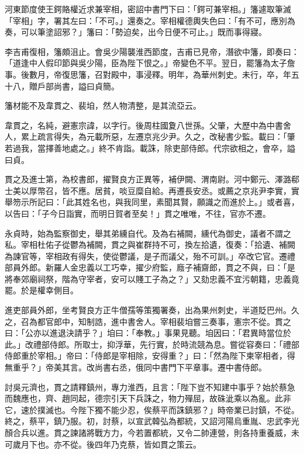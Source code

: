 \begin{pinyinscope}
 河東節度使王鍔賂權近求兼宰相，密詔中書門下曰：「鍔可兼宰相。」籓遽取筆滅「宰相」字，署其左曰：「不可。」還奏之。宰相權德輿失色曰：「有不可，應別為奏，可以筆塗詔邪？」籓曰：「勢迫矣，出今日便不可止。」既而事得寢。



 李吉甫復相，籓頗沮止。會吳少陽襲淮西節度，吉甫已見帝，潛欲中籓，即奏曰：「道逢中人假印節與吳少陽，臣為陛下恨之。」帝變色不平。翌日，罷籓為太子詹事。後數月，帝復思籓，召對殿中，事浸釋。明年，為華州刺史。未行，卒，年五十八，贈戶部尚書，謚曰貞簡。



 籓材能不及韋貫之、裴垍，然人物清整，是其流亞云。



 韋貫之，名純，避憲宗諱，以字行。後周柱國夐八世孫。父肇，大歷中為中書舍人，累上疏言得失，為元載所惡，左遷京兆少尹。久之，改秘書少監。載曰：「肇若過我，當擇善地處之。」終不肯詣。載誅，除吏部侍郎。代宗欲相之，會卒，謚曰貞。



 貫之及進士第，為校書郎，擢賢良方正異等，補伊闕、渭南尉。河中鄭元、澤潞郗士美以厚幣召，皆不應。居貧，啖豆糜自給。再遷長安丞。或薦之京兆尹李實，實舉笏示所記曰：「此其姓名也，與我同里，素聞其賢，願識之而進於上。」或者喜，以告曰：「子今日詣實，而明日賀者至矣！」貫之唯唯，不往，官亦不遷。



 永貞時，始為監察御史，舉其弟纁自代。及為右補闕，纁代為御史，議者不謂之私。宰相杜佑子從鬱為補闕，貫之與崔群持不可，換左拾遺，復奏：「拾遺、補闕為諫官等，宰相政有得失，使從鬱議，是子而議父，殆不可訓。」卒改它官。遷禮部員外郎。新羅人金忠義以工巧幸，擢少府監，廕子補齋郎，貫之不與，曰：「是將奉郊廟祠祭，階為守宰者，安可以賤工子為之？」又劾忠義不宜污朝籍，忠義竟罷。於是權幸側目。



 進吏部員外郎，坐考賢良方正牛僧孺等策獨署奏，出為果州刺史，半道貶巴州。久之，召為都官郎中，知制誥，進中書舍人。宰相裴垍嘗三奏事，憲宗不從。貫之曰：「公亦以進退決請乎？」垍曰：「奉教。」事果見聽。垍因曰：「君異時當位於此。」改禮部侍郎。所取士，抑浮華，先行實，於時流競為息。嘗從容奏曰：「禮部侍郎重於宰相。」帝曰：「侍郎是宰相除，安得重？」曰：「然為陛下柬宰相者，得無重乎？」帝美其言。改尚書右丞，俄同中書門下平章事。遷中書侍郎。



 討吳元濟也，貫之請釋鎮州，專力淮西，且言：「陛下豈不知建中事乎？始於蔡急而魏應也，齊、趙同起，德宗引天下兵誅之，物力殫屈，故硃泚乘以為亂。此非它，速於撲滅也。今陛下獨不能少忍，俟蔡平而誅鎮邪？」時帝業已討鎮，不從。終之，蔡平，鎮乃服。初，討蔡，以宣武韓弘為都統，又詔河陽烏重胤、忠武李光顏合兵以進。貫之諫諸將戰方力，今若置都統，又令二帥連營，則各持重養威，未可歲月下也。亦不從。後四年乃克蔡，皆如貫之策云。




\end{pinyinscope}
